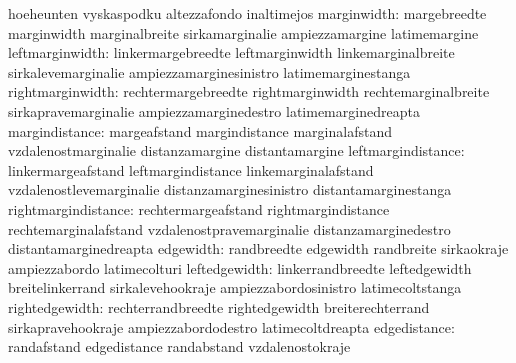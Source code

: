                                   hoeheunten                       vyskaspodku
                                  altezzafondo                     inaltimejos
                     marginwidth: margebreedte                     marginwidth
                                  marginalbreite                   sirkamarginalie
                                  ampiezzamargine                  latimemargine %
                 leftmarginwidth: linkermargebreedte               leftmarginwidth
                                  linkemarginalbreite              sirkalevemarginalie
                                  ampiezzamarginesinistro          latimemarginestanga
                rightmarginwidth: rechtermargebreedte              rightmarginwidth
                                  rechtemarginalbreite             sirkapravemarginalie
                                  ampiezzamarginedestro            latimemarginedreapta
                  margindistance: margeafstand                     margindistance
                                  marginalafstand                  vzdalenostmarginalie
                                  distanzamargine                  distantamargine
              leftmargindistance: linkermargeafstand               leftmargindistance
                                  linkemarginalafstand             vzdalenostlevemarginalie
                                  distanzamarginesinistro          distantamarginestanga
             rightmargindistance: rechtermargeafstand              rightmargindistance
                                  rechtemarginalafstand            vzdalenostpravemarginalie
                                  distanzamarginedestro            distantamarginedreapta
                       edgewidth: randbreedte                      edgewidth
                                  randbreite                       sirkaokraje
                                  ampiezzabordo                    latimecolturi
                   leftedgewidth: linkerrandbreedte                leftedgewidth
                                  breitelinkerrand                 sirkalevehookraje
                                  ampiezzabordosinistro            latimecoltstanga
                  rightedgewidth: rechterrandbreedte               rightedgewidth
                                  breiterechterrand                sirkapravehookraje
                                  ampiezzabordodestro              latimecoltdreapta
                    edgedistance: randafstand                      edgedistance
                                  randabstand                      vzdalenostokraje
